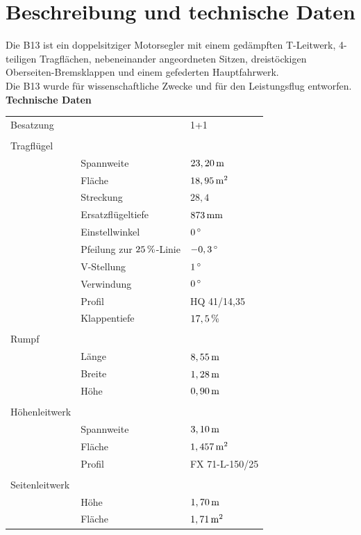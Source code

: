 \section{Beschreibung und technische Daten}
Die B13 ist ein doppelsitziger Motorsegler mit einem gedämpften T-Leitwerk, 4-teiligen Tragflächen, nebeneinander angeordneten Sitzen, dreistöckigen Oberseiten-Bremsklappen und einem gefederten Hauptfahrwerk.\\
\newline
Die B13 wurde für wissenschaftliche Zwecke und für den Leistungsflug entworfen.
\newpage
\textbf{Technische Daten}\\

\begin{longtable}{l l l}
Besatzung & & 1+1\\
 & & \\
 Tragflügel & & \\
  & Spannweite & $\unit[23,20]{m}$\\
  & Fläche & $\unit[18,95]{m^2}$\\
  & Streckung & $28,4$ \\
  & Ersatzflügeltiefe & $\unit[873]{mm}$ \\
  & Einstellwinkel & $\unit[0]{^{\circ}}$ \\
  & Pfeilung zur $\unit[25]{\%}$-Linie & $\unit[-0,3]{^{\circ}}$ \\
  & V-Stellung & $\unit[1]{^{\circ}}$\\
  & Verwindung & $\unit[0]{^{\circ}}$\\
  & Profil & HQ 41/14,35\\
  & Klappentiefe & $\unit[17,5]{\%}$ \\
  & & \\
 Rumpf & & \\
 & Länge & $\unit[8,55]{m}$\\
 & Breite & $\unit[1,28]{m}$\\
 & Höhe & $\unit[0,90]{m}$ \\
 & & \\
 Höhenleitwerk & & \\
 & Spannweite & $\unit[3,10]{m}$\\
 & Fläche & $\unit[1,457]{m^2}$\\
 & Profil & FX 71-L-150/25 \\
 & & \\
 Seitenleitwerk & & \\
 & Höhe & $\unit[1,70]{m}$ \\
 & Fläche & $\unit[1,71]{m^2}$\\

\end{longtable}
